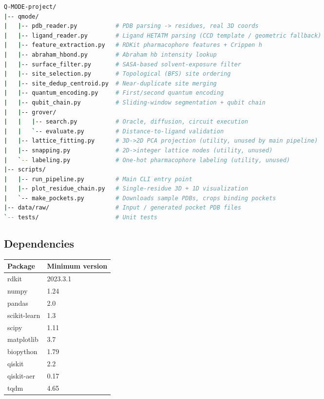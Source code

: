 \documentclass[11pt,a4paper]{article}
\begin{document}
\begin{lstlisting}[language=bash]
Q-MODE-project/
|-- qmode/
|   |-- pdb_reader.py           # PDB parsing -> residues, real 3D coords
|   |-- ligand_reader.py        # Ligand HETATM parsing (CCD template / geometric fallback)
|   |-- feature_extraction.py   # RDKit pharmacophore features + Crippen h
|   |-- abraham_hbond.py        # Abraham hb intensity lookup
|   |-- surface_filter.py       # SASA-based solvent-exposure filter
|   |-- site_selection.py       # Topological (BFS) site ordering
|   |-- site_dedup_centroid.py  # Near-duplicate site merging
|   |-- quantum_encoding.py     # First/second quantum encoding
|   |-- qubit_chain.py          # Sliding-window segmentation + qubit chain
|   |-- grover/
|   |   |-- search.py           # Oracle, diffusion, circuit execution
|   |   `-- evaluate.py         # Distance-to-ligand validation
|   |-- lattice_fitting.py      # 3D->2D PCA projection (utility, unused by main pipeline)
|   |-- snapping.py             # 2D->integer lattice nodes (utility, unused)
|   `-- labeling.py             # One-hot pharmacophore labeling (utility, unused)
|-- scripts/
|   |-- run_pipeline.py         # Main CLI entry point
|   |-- plot_residue_chain.py   # Single-residue 3D + 1D visualization
|   `-- make_pockets.py         # Downloads sample PDBs, crops binding pockets
|-- data/raw/                   # Input / generated pocket PDB files
`-- tests/                      # Unit tests
\end{lstlisting}

\subsection{Dependencies}

\begin{center}
\begin{tabular}{ll}
\toprule
\textbf{Package} & \textbf{Minimum version} \\
\midrule
rdkit & 2023.3.1 \\
numpy & 1.24 \\
pandas & 2.0 \\
scikit-learn & 1.3 \\
scipy & 1.11 \\
matplotlib & 3.7 \\
biopython & 1.79 \\
qiskit & 2.2 \\
qiskit-aer & 0.17 \\
tqdm & 4.65 \\
\bottomrule
\end{tabular}
\end{center}
\end{document}

